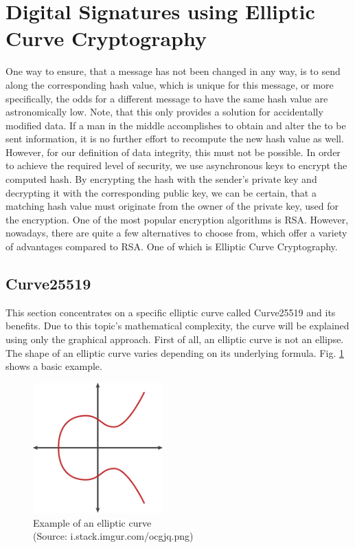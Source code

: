 \section{Digital Signatures using Elliptic Curve Cryptography}

One way to ensure, that a message has not been changed in any way, is to send along the corresponding hash value, which is unique for this message, or more specifically, the odds for a different message to have the same hash value are astronomically low. Note, that this only provides a solution for accidentally modified data. If a man in the middle accomplishes to obtain and alter the to be sent information, it is no further effort to recompute the new hash value as well. However, for our definition of data integrity, this must not be possible. In order to achieve the required level of security, we use asynchronous keys to encrypt the computed hash. By encrypting the hash with the sender's private key and decrypting it with the corresponding public key, we can be certain, that a matching hash value must originate from the owner of the private key, used for the encryption. 
One of the most popular encryption algorithms is RSA. However, nowadays, there are quite a few alternatives to choose from, which offer a variety of advantages compared to RSA. One of which is Elliptic Curve Cryptography. 

\subsection{Curve25519}
This section concentrates on a specific elliptic curve called Curve25519 and its benefits.
Due to this topic's mathematical complexity, the curve will be explained using only the graphical approach.
First of all, an elliptic curve is not an ellipse. The shape of an elliptic curve varies depending on its underlying formula. Fig. \ref{ec1} shows a basic example.
\begin{figure}
\centering
\includegraphics[width=5cm]{Pages/EC/ec.png}
\caption{Example of an elliptic curve \\ (Source: i.stack.imgur.com/ocgjq.png)}
\label{ec1}
\end{figure}

